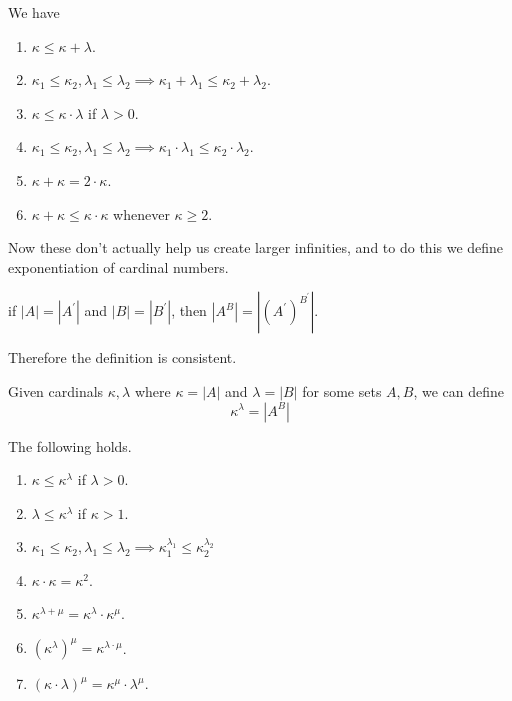   \begin{theorem}[Inequalities]
    We have 
    \begin{enumerate}
      \item $\kappa \leq \kappa + \lambda$. 
      \item $\kappa_1 \leq \kappa_2, \lambda_1 \leq \lambda_2 \implies \kappa_1 + \lambda_1 \leq \kappa_2 + \lambda_2$. 
      \item $\kappa \leq \kappa \cdot \lambda$ if $\lambda > 0$. 
      \item $\kappa_1 \leq \kappa_2, \lambda_1 \leq \lambda_2 \implies \kappa_1 \cdot \lambda_1 \leq \kappa_2 \cdot \lambda_2$. 
      \item $\kappa + \kappa = 2 \cdot \kappa$. 
      \item $\kappa + \kappa \leq \kappa \cdot \kappa$ whenever $\kappa \geq 2$. 
    \end{enumerate}
  \end{theorem} 

  Now these don't actually help us create larger infinities, and to do this we define exponentiation of cardinal numbers. 

  \begin{lemma} 
    if $|A| = |A^\prime|$ and $|B| = |B^\prime|$, then $|A^B| = |(A^\prime)^{B^\prime}|$. 
  \end{lemma}

  Therefore the definition is consistent. 

  \begin{definition}
    Given cardinals $\kappa, \lambda$ where $\kappa = |A|$ and $\lambda = |B|$ for some sets $A, B$, we can define 
    \begin{equation}
      \kappa^{\lambda} = |A^B|
    \end{equation}
  \end{definition}

  \begin{theorem}
    The following holds. 
    \begin{enumerate}
      \item $\kappa \leq \kappa^\lambda$ if $\lambda > 0$. 
      \item $\lambda \leq \kappa^\lambda$ if $\kappa > 1$.  
      \item $\kappa_1 \leq \kappa_2, \lambda_1 \leq \lambda_2 \implies \kappa_1^{\lambda_1} \leq \kappa_2^{\lambda_2}$ 
      \item $\kappa \cdot \kappa = \kappa^2$. 
      \item $\kappa^{\lambda + \mu} = \kappa^\lambda \cdot \kappa^\mu$. 
      \item $(\kappa^{\lambda})^\mu = \kappa^{\lambda \cdot \mu}$. 
      \item $(\kappa \cdot \lambda)^\mu = \kappa^\mu \cdot \lambda^\mu$. 
    \end{enumerate}
  \end{theorem} 

